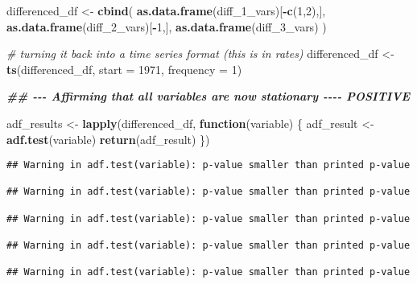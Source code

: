 \documentclass[
]{article}
\newenvironment{Shaded}{\begin{snugshade}}{\end{snugshade}}
\newcommand{\AttributeTok}[1]{\textcolor[rgb]{0.13,0.29,0.53}{#1}}
\newcommand{\CommentTok}[1]{\textcolor[rgb]{0.56,0.35,0.01}{\textit{#1}}}
\newcommand{\ControlFlowTok}[1]{\textcolor[rgb]{0.13,0.29,0.53}{\textbf{#1}}}
\newcommand{\DecValTok}[1]{\textcolor[rgb]{0.00,0.00,0.81}{#1}}
\newcommand{\DocumentationTok}[1]{\textcolor[rgb]{0.56,0.35,0.01}{\textbf{\textit{#1}}}}
\newcommand{\FunctionTok}[1]{\textcolor[rgb]{0.13,0.29,0.53}{\textbf{#1}}}
\newcommand{\NormalTok}[1]{#1}
\newcommand{\OtherTok}[1]{\textcolor[rgb]{0.56,0.35,0.01}{#1}}
\newcommand{\SpecialCharTok}[1]{\textcolor[rgb]{0.81,0.36,0.00}{\textbf{#1}}}
\begin{document}
\begin{Shaded}
\begin{Highlighting}[]
\NormalTok{differenced\_df }\OtherTok{\textless{}{-}} \FunctionTok{cbind}\NormalTok{(}
  \FunctionTok{as.data.frame}\NormalTok{(diff\_1\_vars)[}\SpecialCharTok{{-}}\FunctionTok{c}\NormalTok{(}\DecValTok{1}\NormalTok{,}\DecValTok{2}\NormalTok{),],}
  \FunctionTok{as.data.frame}\NormalTok{(diff\_2\_vars)[}\SpecialCharTok{{-}}\DecValTok{1}\NormalTok{,],}
  \FunctionTok{as.data.frame}\NormalTok{(diff\_3\_vars)}
\NormalTok{)}

\CommentTok{\# turning it back into a time series format (this is in rates)}
\NormalTok{differenced\_df }\OtherTok{\textless{}{-}} \FunctionTok{ts}\NormalTok{(differenced\_df, }\AttributeTok{start =} \DecValTok{1971}\NormalTok{, }\AttributeTok{frequency =} \DecValTok{1}\NormalTok{)}


\DocumentationTok{\#\# {-}{-}{-} Affirming that all variables are now stationary {-}{-}{-}{-} POSITIVE}

\NormalTok{adf\_results }\OtherTok{\textless{}{-}} \FunctionTok{lapply}\NormalTok{(differenced\_df, }\ControlFlowTok{function}\NormalTok{(variable) \{}
\NormalTok{  adf\_result }\OtherTok{\textless{}{-}} \FunctionTok{adf.test}\NormalTok{(variable)}
  \FunctionTok{return}\NormalTok{(adf\_result)}
\NormalTok{\})}
\end{Highlighting}
\end{Shaded}

\begin{verbatim}
## Warning in adf.test(variable): p-value smaller than printed p-value

## Warning in adf.test(variable): p-value smaller than printed p-value

## Warning in adf.test(variable): p-value smaller than printed p-value

## Warning in adf.test(variable): p-value smaller than printed p-value

## Warning in adf.test(variable): p-value smaller than printed p-value
\end{verbatim}
\end{document}
